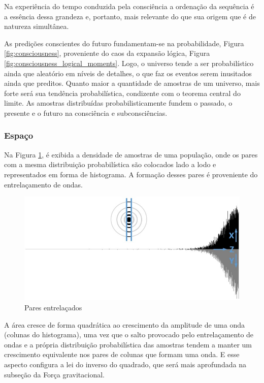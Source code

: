Na experiência do tempo conduzida pela consciência a ordenação da sequência é a essência dessa grandeza e, portanto, mais relevante do que sua origem que é de natureza simultânea.

As predições conscientes do futuro fundamentam-se na probabilidade, Figura \ref{fig:consciousness}, proveniente do caos da expansão lógica, Figura \ref{fig:consciousness_logical_moments}. Logo, o universo tende a ser probabilístico ainda que aleatório em níveis de detalhes, o que faz os eventos serem inusitados ainda que preditos. Quanto maior a quantidade de amostras de um universo, mais forte será sua tendência probabilística, condizente com o teorema central do limite. As amostras distribuídas probabilisticamente fundem o passado, o presente e o futuro na consciência e subconsciências. 

\subsubsection{Espaço}
Na Figura \ref{fig:consciousness_space_waves}, é exibida a densidade de amostras de uma população, onde os pares com a mesma distribuição probabilística são colocados lado a lodo e representados em forma de histograma. A formação desses pares é proveniente do entrelaçamento de ondas.
	\begin{figure}[H]
	\caption{Pares entrelaçados}
	\label{fig:consciousness_space_waves}
	\centering
	\includegraphics[scale=.7]{sections/images/consciousness_space_waves.jpg}
	\end{figure}

A área cresce de forma quadrática ao crescimento da amplitude de uma onda (colunas do histograma), uma vez que o salto provocado pelo entrelaçamento de ondas e a própria distribuição probabilística das amostras tendem a manter um crescimento equivalente nos pares de colunas que formam uma onda. E esse aspecto configura a lei do inverso do quadrado, que será mais aprofundada na subseção da Força gravitacional.

